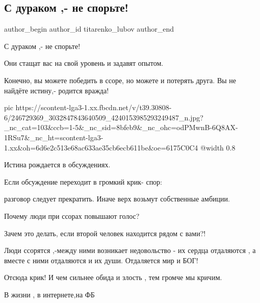  
 
 
 
 
 
\subsection{С дураком ,- не спорьте!}
\label{sec:20_10_2021.fb.titarenko_lubov.1.s_durakom_ne_sporjte}
 
\ifcmt
 author_begin
   author_id titarenko_lubov
 author_end
\fi

С дураком ,- не спорьте!

Они стащат  вас  на свой уровень  и задавят опытом.

Конечно, вы можете победить в ссоре, но можете и потерять друга. Вы не найдёте
истину,- родится вражда!

\ifcmt
  pic https://scontent-lga3-1.xx.fbcdn.net/v/t39.30808-6/246729369_3032847843640509_4240153985293249487_n.jpg?_nc_cat=103&ccb=1-5&_nc_sid=8bfeb9&_nc_ohc=odPMwnB-6Q8AX-1RSu7&_nc_ht=scontent-lga3-1.xx&oh=6d6e2c513e68ac633ae35cb6ecb611be&oe=6175C0C4
  @width 0.8
\fi

Истина рождается в обсуждениях. 

Если обсуждение переходит в громкий крик- спор:

разговор следует прекратить. Иначе верх возьмут собственные амбиции.

Почему люди при ссорах повышают голос?

Зачем это делать, если второй человек находится рядом с вами?!

 Люди ссорятся ,-между ними возникает недовольство - их сердца  отдаляются , а
 вместе с ними отдаляются  и их души. Отдаляется мир и БОГ!

Отсюда крик! И чем сильнее обида  и злость , тем громче мы кричим.  

В жизни , в интернете,на ФБ


